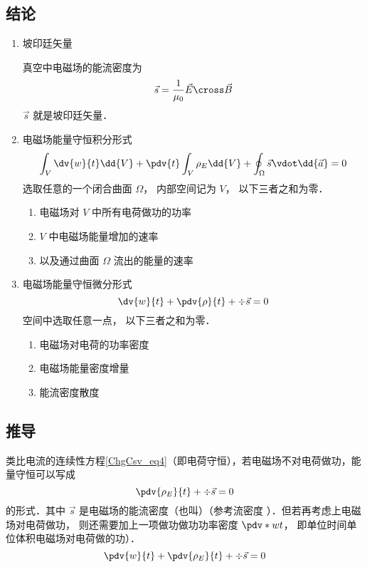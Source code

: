 


\subsection{结论}
\begin{enumerate}
\item 坡印廷矢量

真空中电磁场的能流密度为
\begin{equation}
\vec s = \frac{1}{\mu_0} \vec E \cross \vec B
\end{equation} 
$\vec s$ 就是坡印廷矢量．


\item 电磁场能量守恒积分形式
\begin{equation}
\int_V \dv{w}{t} \dd{V}  + \pdv{t} \int_V \rho_E \dd{V}  + \oint_\Omega  \vec s \vdot \dd{\vec a}  = 0
\end{equation} 
选取任意的一个闭合曲面 $\Omega $， 内部空间记为 $V$， 以下三者之和为零．
\begin{enumerate}
\item 电磁场对 $V$ 中所有电荷做功的功率
\item $V$ 中电磁场能量增加的速率
\item 以及通过曲面 $\Omega $ 流出的能量的速率
\end{enumerate}

\item 电磁场能量守恒微分形式
\begin{equation}
\dv{w}{t} + \pdv{\rho}{t} + \div \vec s = 0
\end{equation} 
空间中选取任意一点， 以下三者之和为零．
\begin{enumerate}
\item 电磁场对电荷的功率密度
\item 电磁场能量密度增量
\item 能流密度散度
\end{enumerate}
\end{enumerate}

\subsection{推导}
类比电流的连续性方程\autoref{ChgCsv_eq4}（即电荷守恒），若电磁场不对电荷做功，能量守恒可以写成
\begin{equation}
\pdv{\rho_E}{t} + \div \vec s = 0
\end{equation} 
的形式．其中 $\vec s$ 是电磁场的能流密度（也叫）（参考流密度%
）．但若再考虑上电磁场对电荷做功， 则还需要加上一项做功做功功率密度 $\pdv*{w}{t}$， 即单位时间单位体积电磁场对电荷做的功）．
\begin{equation}\label{EBS_eq1}
\pdv{w}{t} + \pdv{\rho_E}{t} + \div \vec s = 0
\end{equation} 

